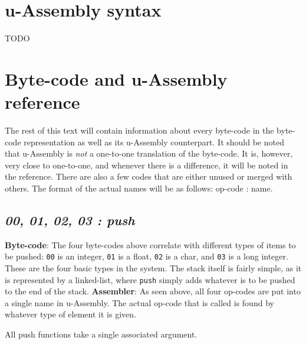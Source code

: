 \documentclass[12pt]{report}
\begin{document}
  \section{u-Assembly syntax}
  TODO
  \section{Byte-code and u-Assembly reference}
  The rest of this text will contain information about every byte-code in the 
  byte-code representation as well as its u-Assembly counterpart.  It should be noted
  that u-Assembly is \emph{not} a one-to-one translation of the byte-code.  It is,
  however, very close to one-to-one, and whenever there is a difference, it will be
  noted in the reference.  There are also a few codes that are either unused or
  merged with others.  The format of the actual names will be as follows:
  op-code : name.
  \subsection{\emph{00, 01, 02, 03 : push}}
  \textbf{Byte-code}: The four byte-codes above correlate with different types of
  items to be pushed: \verb|00| is an integer, \verb|01| is a float, \verb|02| is a
  char, and \verb|03| is a long integer.  These are the four basic types in the system.
  The stack itself is fairly simple, as it is represented by a linked-list, where
  \verb|push| simply adds whatever is to be pushed to the end of the stack.\newline
  \textbf{Assembler}: As seen above, all four op-codes are put into a single name in
  u-Assembly.  The actual op-code that is called is found by whatever type of
  element it is given.

  All push functions take a single associated argument.
\end{document}
